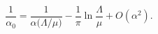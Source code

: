 \begin{equation}
\frac{1}{\alpha_0} = \frac{1}{\alpha\Big(\Lambda/\mu\Big)}
- \frac{1}{\pi} \ln \frac{\Lambda}{\mu} + O(\alpha^2).
\end{equation}

